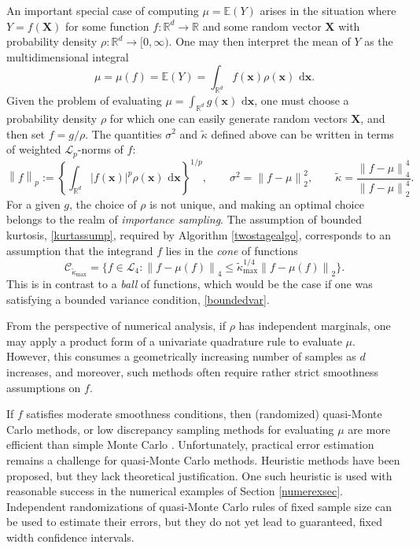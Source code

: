 \documentclass[graybox]{svmult}
\newcommand\reals{\mathbb{R}}
\newcommand\e{\mathbb{E}}
\newcommand{\vx}{\boldsymbol{x}}
\newcommand{\vX}{\boldsymbol{X}}
\newcommand{\rd}{\,\mathrm{d}}
\newcommand{\abs}[1]{\left|#1\right|}
\newcommand{\dif}{\rd}
\newcommand{\tkappa}{\tilde{\kappa}}
\newcommand{\cc}{\mathcal{C}}
\newcommand{\cl}{\mathcal{L}}
\def\abs#1{\ensuremath{\left \lvert #1 \right \rvert}}
\newcommand{\norm}[2][{}]{\ensuremath{\left \lVert #2 \right \rVert}_{#1}}
\begin{document}
An important special case of computing $\mu=\e(Y)$ arises in the situation where $Y=f(\vX)$ for some function $f: \reals^d \to \reals$ and some random vector $\vX$ with probability density $\rho: \reals^d \to [0,\infty)$.  One may then interpret the mean of $Y$ as the multidimensional integral 
\begin{equation} \label{muintegral}
\mu=\mu(f)=\e(Y) = \int_{\reals^d} f(\vx) \rho(\vx) \, \dif \vx.
\end{equation}
Given the problem of evaluating $\mu=\int_{\reals^d} g(\vx) \, \dif \vx$, one must choose a probability density $\rho$ for which one can easily generate random vectors $\vX$, and then set $f = g/\rho$.  The quantities $\sigma^2$ and $\tkappa$ defined above can be written in terms of weighted $\cl_p$-norms of $f$:
\begin{equation} \label{Lpnormdef}
\norm[p]{f} :=\left\{\int_{\reals^d} \abs{f(\vx)}^p \rho(\vx) \, \dif \vx\right\}^{1/p}, \qquad
\sigma^2 = \norm[2]{f-\mu}^2, \qquad \tkappa = \frac{\norm[4]{f-\mu}^4}{\norm[2]{f-\mu}^4}.
\end{equation}
For a given $g$, the choice of $\rho$ is not unique, and making an optimal choice belongs to the realm of \emph{importance sampling}. The assumption of bounded kurtosis, \eqref{kurtassump}, required by Algorithm \ref{twostagealgo}, corresponds to an assumption that the integrand $f$ lies in the \emph{cone} of functions
\begin{equation} \label{conedef}
\cc_{\tkappa_{\max}} = \{ f \in \cl_4 : \norm[4]{f-\mu(f)} \le \tkappa_{\max}^{1/4} \norm[2]{f-\mu(f)} \}.
\end{equation}
This is in contrast to a \emph{ball} of functions, which would be the case if one was satisfying a bounded variance condition, \eqref{boundedvar}.

From the perspective of numerical analysis, if $\rho$ has independent marginals, one may apply a product form of a univariate quadrature rule to evaluate $\mu$.  However, this consumes a geometrically increasing number of samples as $d$ increases, and moreover, such methods often require rather strict smoothness assumptions on $f$.  

If $f$ satisfies moderate smoothness conditions, then (randomized) quasi-Monte Carlo methods, or low discrepancy sampling methods for evaluating $\mu$ are more efficient than simple Monte Carlo \citep{Nie92,SloJoe94,Lem09a,DicPil10a}.  
Unfortunately, practical error estimation remains a challenge for quasi-Monte Carlo methods.  Heuristic methods have been proposed, but they lack theoretical justification. One such heuristic is used with reasonable success in the numerical examples of Section \ref{numerexsec}.  Independent randomizations of quasi-Monte Carlo rules of fixed sample size can be used to estimate their errors, but they do not yet lead to guaranteed, fixed width confidence intervals.
\end{document}
